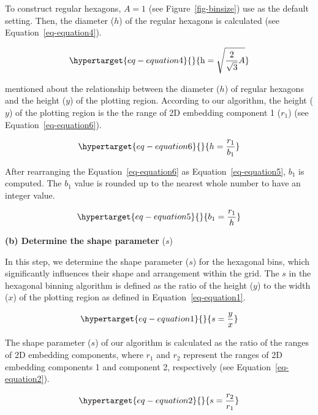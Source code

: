 \documentclass[
  12pt]{article}
\begin{document}
To construct regular hexagons, \(A = 1\) (see Figure~\ref{fig-binsize})
use as the default setting. Then, the diameter (\(h\)) of the regular
hexagons is calculated (see Equation~\ref{eq-equation4}).

\begin{equation}\protect\hypertarget{eq-equation4}{}{
  \text{h} = \sqrt{\frac{2}{\sqrt{3}}A}
}\label{eq-equation4}\end{equation}

\citet{Carr2013} mentioned about the relationship between the diameter
(\(h\)) of regular hexagons and the height (\(y\)) of the plotting
region. According to our algorithm, the height (\(y\)) of the plotting
region is the the range of 2D embedding component 1 (\(r_1\)) (see
Equation~\ref{eq-equation6}).

\begin{equation}\protect\hypertarget{eq-equation6}{}{
h = \frac{r_1}{b_1}
}\label{eq-equation6}\end{equation}

After rearranging the Equation~\ref{eq-equation6} as
Equation~\ref{eq-equation5}, \(b_1\) is computed. The \(b_1\) value is
rounded up to the nearest whole number to have an integer value.

\begin{equation}\protect\hypertarget{eq-equation5}{}{
b_1 = \frac{r_1}{h}
}\label{eq-equation5}\end{equation}

\textbf{(b) Determine the shape parameter} (\(s\))

In this step, we determine the shape parameter (\(s\)) for the hexagonal
bins, which significantly influences their shape and arrangement within
the grid. The \(s\) in the hexagonal binning algorithm is defined as the
ratio of the height (\(y\)) to the width (\(x\)) of the plotting region
as defined in Equation~\ref{eq-equation1}.

\begin{equation}\protect\hypertarget{eq-equation1}{}{
s = \frac{y}{x}
}\label{eq-equation1}\end{equation}

The shape parameter (\(s\)) of our algorithm is calculated as the ratio
of the ranges of 2D embedding components, where \(r_1\) and \(r_2\)
represent the ranges of 2D embedding components 1 and component 2,
respectively (see Equation~\ref{eq-equation2}).

\begin{equation}\protect\hypertarget{eq-equation2}{}{
s = \frac{r_2}{r_1}
}\label{eq-equation2}\end{equation}
\end{document}
